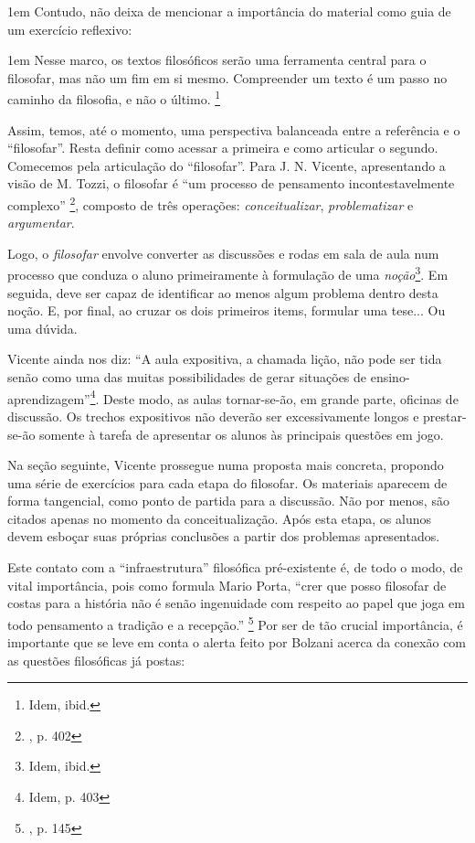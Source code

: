 \documentclass[12pt,a4paper]{article}
\newenvironment{citac}{
	\begin{addmargin}[4cm]{1em} \footnotesize}{\normalfont \end{addmargin}
}
\begin{document}
\begin{citac}
	Contudo, não deixa de mencionar a importância do material como 
	guia de um exercício reflexivo: 
	
	\begin{citac}
		Nesse marco, os textos filosóficos serão uma ferramenta 
		central para o filosofar, mas não um fim em si mesmo. 
		Compreender um texto é um passo no caminho da filosofia, 
		e não o último. 
		\footnote{Idem, ibid.}
	\end{citac}

	Assim, temos, até o momento, uma perspectiva balanceada entre 
	a referência e o “filosofar”. Resta definir como acessar a 
	primeira e como articular o segundo. Comecemos pela articulação 
	do “filosofar”. Para J. N. Vicente, apresentando a visão de M. Tozzi, 
	o filosofar é “um processo de pensamento incontestavelmente complexo”
	\footnote{\cite{neves}, p. 402}, composto de três operações: 
	\emph{conceitualizar}, \emph{problematizar} e \emph{argumentar}. 

	Logo, o \emph{filosofar} envolve converter as discussões e rodas 
	em sala de aula num processo que conduza o aluno primeiramente 
	à formulação de uma \emph{noção}\footnote{Idem, ibid.}. 
	Em seguida, deve ser capaz de identificar ao menos algum problema 
	dentro desta noção. E, por final, ao cruzar os dois primeiros 
	items, formular uma tese... Ou uma dúvida. 

	Vicente ainda nos diz: “A aula expositiva, a chamada lição, não 
	pode ser tida senão como uma das muitas possibilidades de gerar 
	situações de ensino-aprendizagem”\footnote{Idem, p. 403}. 
	Deste modo, as aulas tornar-se-ão, em grande parte, oficinas de 
	discussão. Os trechos expositivos não deverão ser excessivamente 
	longos e prestar-se-ão somente à tarefa de apresentar os alunos 
	às principais questões em jogo. 

	Na seção seguinte, Vicente prossegue numa proposta mais concreta, 
	propondo uma série de exercícios para cada etapa do filosofar. Os 
	materiais aparecem de forma tangencial, como ponto de partida para 
	a discussão. Não por menos, são citados apenas no momento da 
	conceitualização. Após esta etapa, os alunos devem esboçar suas 
	próprias conclusões a partir dos problemas apresentados.  

	Este contato com a “infraestrutura” filosófica pré-existente é, 
	de todo o modo, de vital importância, pois
	como formula Mario Porta, “crer que posso 
	filosofar de costas para a história não é senão ingenuidade
	com respeito ao papel que joga em todo pensamento a tradição 
	e a recepção.” \footnote{\cite{porta}, p. 145}
	Por ser de tão crucial importância, é importante 
	que se leve em conta o alerta feito por Bolzani acerca da 
	conexão com as questões filosóficas já postas: 


\end{citac}
\end{document}
